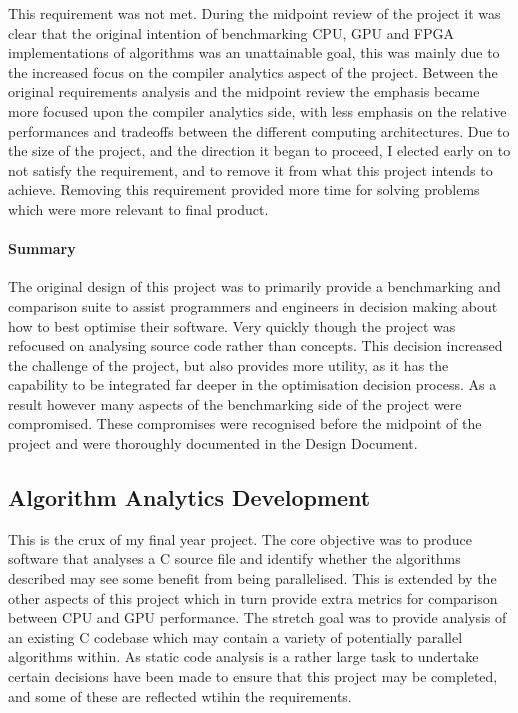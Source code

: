 This requirement was not met. During the midpoint review of the project it was clear that the
original intention of benchmarking CPU, GPU and FPGA implementations of algorithms was an
unattainable goal, this was mainly due to the increased focus on the compiler analytics aspect of
the project. Between the original requirements analysis and the midpoint review the emphasis became
more focused upon the compiler analytics side, with less emphasis on the relative performances and
tradeoffs between the different computing architectures.  Due to the size of the project, and the
direction it began to proceed, I elected early on to not satisfy the requirement, and to remove it from
what this project intends to achieve. Removing this requirement provided more time for solving
problems which were more relevant to final product.

\paragraph{Summary}
The original design of this project was to primarily provide a benchmarking and comparison suite to
assist programmers and engineers in decision making about how to best optimise their software.  Very
quickly though the project was refocused on analysing source code rather than concepts. This
decision increased the challenge of the project, but also provides more utility, as it has the
capability to be integrated far deeper in the optimisation decision process. As a result however
many aspects of the benchmarking side of the project were compromised. These compromises were
recognised before the midpoint of the project and were thoroughly documented in the Design Document.

\subsection{Algorithm Analytics Development}
This is the crux of my final year project. The core objective was to produce software that analyses
a C source file and identify whether the algorithms described may see some benefit from being
parallelised. This is extended by the other aspects of this project which in turn provide extra
metrics for comparison between CPU and GPU performance. The stretch goal was to provide analysis of
an existing C codebase which may contain a variety of potentially parallel algorithms within. As
static code analysis is a rather large task to undertake certain decisions have been made to ensure
that this project may be completed, and some of these are reflected wtihin the requirements.

